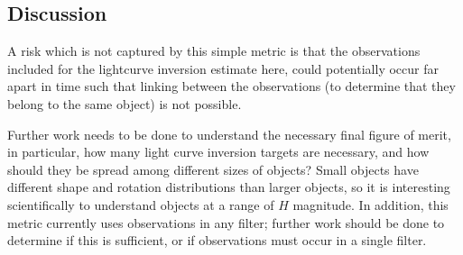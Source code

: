 
\subsection{Discussion}
\label{sec:\secname:discussion}

A risk which is not captured by this simple metric is that the
observations included for the lightcurve inversion estimate here,
could potentially occur far apart in time such that linking between
the observations (to determine that they belong to the same object) is
not possible.

Further work needs to be done to understand the necessary final figure
of merit, in particular, how many light curve inversion targets are
necessary, and how should they be spread among different sizes of
objects? Small objects have different shape and
rotation distributions than larger objects, so it is interesting
scientifically to understand objects at a range of $H$ magnitude. In
addition, this metric currently uses observations in any filter;
further work should be done to determine if this is sufficient, or if
observations must occur in a single filter.

